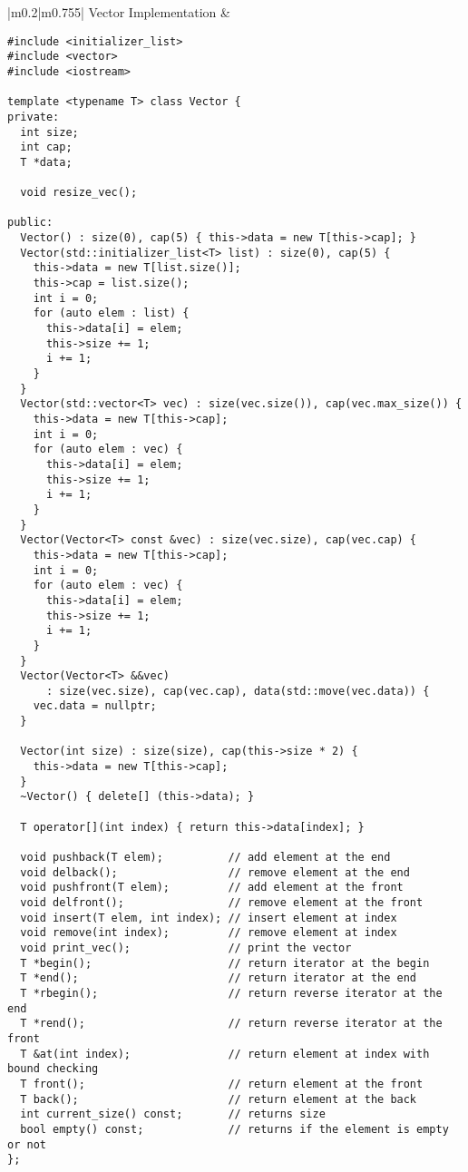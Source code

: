 \documentclass[main.tex,fontsize=8pt,paper=a4,paper=portrait,DIV=calc,]{scrartcl}
\begin{document}
\begin{table}[ht!]
\begin{tabular}{|m{0.2\linewidth}|m{0.755\linewidth}|}
\hline
Vector Implementation & 
\vspace{2mm}
\begin{lstlisting}
#include <initializer_list>
#include <vector>
#include <iostream>

template <typename T> class Vector {
private:
  int size;
  int cap;
  T *data;

  void resize_vec();

public:
  Vector() : size(0), cap(5) { this->data = new T[this->cap]; }
  Vector(std::initializer_list<T> list) : size(0), cap(5) {
    this->data = new T[list.size()];
    this->cap = list.size();
    int i = 0;
    for (auto elem : list) {
      this->data[i] = elem;
      this->size += 1;
      i += 1;
    }
  }
  Vector(std::vector<T> vec) : size(vec.size()), cap(vec.max_size()) {
    this->data = new T[this->cap];
    int i = 0;
    for (auto elem : vec) {
      this->data[i] = elem;
      this->size += 1;
      i += 1;
    }
  }
  Vector(Vector<T> const &vec) : size(vec.size), cap(vec.cap) {
    this->data = new T[this->cap];
    int i = 0;
    for (auto elem : vec) {
      this->data[i] = elem;
      this->size += 1;
      i += 1;
    }
  }
  Vector(Vector<T> &&vec)
      : size(vec.size), cap(vec.cap), data(std::move(vec.data)) {
    vec.data = nullptr;
  }

  Vector(int size) : size(size), cap(this->size * 2) {
    this->data = new T[this->cap];
  }
  ~Vector() { delete[] (this->data); }

  T operator[](int index) { return this->data[index]; }

  void pushback(T elem);          // add element at the end
  void delback();                 // remove element at the end
  void pushfront(T elem);         // add element at the front
  void delfront();                // remove element at the front
  void insert(T elem, int index); // insert element at index
  void remove(int index);         // remove element at index
  void print_vec();               // print the vector
  T *begin();                     // return iterator at the begin
  T *end();                       // return iterator at the end
  T *rbegin();                    // return reverse iterator at the end
  T *rend();                      // return reverse iterator at the front
  T &at(int index);               // return element at index with bound checking
  T front();                      // return element at the front
  T back();                       // return element at the back
  int current_size() const;       // returns size
  bool empty() const;             // returns if the element is empty or not
};


\end{lstlisting}
\end{tabular}
\end{table}
\end{document}
